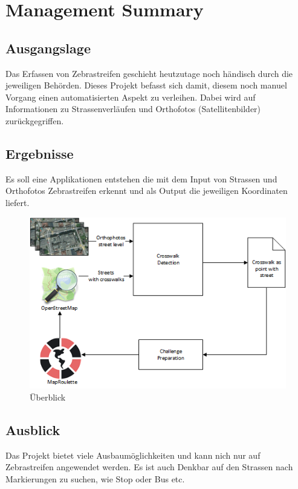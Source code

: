 \chapter*{Management Summary}
\section{Ausgangslage}
Das Erfassen von Zebrastreifen geschieht heutzutage noch händisch durch die jeweiligen Behörden.
Dieses Projekt befasst sich damit, diesem noch manuel Vorgang einen automatisierten Aspekt zu verleihen.
Dabei wird auf Informationen zu Strassenverläufen und Orthofotos (Satellitenbilder) zurückgegriffen. 
\section{Ergebnisse}
Es soll eine Applikationen entstehen die mit dem Input von Strassen und Orthofotos Zebrastreifen erkennt und als Output die jeweiligen Koordinaten liefert.
\begin{figure}[ht]
\includegraphics[width=\textwidth]{images/management_summary_1.png}
\caption[Überblick]{Überblick}
\end{figure}
\section{Ausblick}
Das Projekt bietet viele Ausbaumöglichkeiten und kann nich nur auf Zebrastreifen angewendet werden. Es ist auch Denkbar auf den Strassen nach Markierungen zu suchen, wie Stop oder Bus etc.